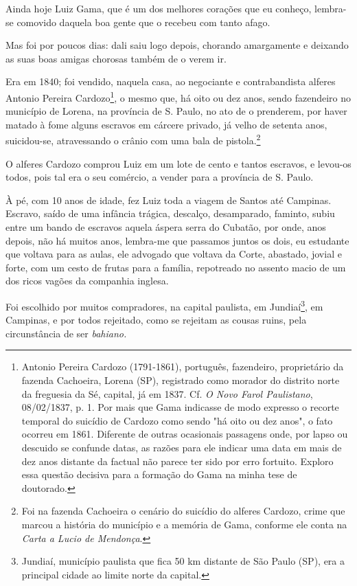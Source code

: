 Ainda hoje Luiz Gama, que é um dos melhores corações que eu conheço,
lembra-se comovido daquela boa gente que o recebeu com tanto afago.

Mas foi por poucos dias: dali saiu logo depois, chorando amargamente e
deixando as suas boas amigas chorosas também de o verem ir.

Era em 1840; foi vendido, naquela casa, ao negociante e contrabandista
alferes Antonio Pereira Cardozo\footnote{Antonio Pereira Cardozo
  (1791-1861), português, fazendeiro, proprietário da fazenda Cachoeira,
  Lorena (SP), registrado como morador do distrito norte da freguesia da
  Sé, capital, já em 1837. Cf. \emph{O Novo Farol Paulistano},
  08/02/1837, p. 1. Por mais que Gama indicasse de modo expresso o
  recorte temporal do suicídio de Cardozo como sendo "há oito ou dez
  anos", o fato ocorreu em 1861. Diferente de outras ocasionais
  passagens onde, por lapso ou descuido se confunde datas, as razões
  para ele indicar uma data em mais de dez anos distante da factual não
  parece ter sido por erro fortuito. Exploro essa questão decisiva para
  a formação do Gama na minha tese de doutorado.}, o mesmo que, há oito
ou dez anos, sendo fazendeiro no município de Lorena, na província de S.
Paulo, no ato de o prenderem, por haver matado à fome alguns escravos em
cárcere privado, já velho de setenta anos, suicidou-se, atravessando o
crânio com uma bala de pistola.\footnote{Foi na fazenda Cachoeira o
  cenário do suicídio do alferes Cardozo, crime que marcou a história do
  município e a memória de Gama, conforme ele conta na \emph{Carta a
  Lucio de Mendonça}.}

O alferes Cardozo comprou Luiz em um lote de cento e tantos escravos, e
levou-os todos, pois tal era o seu comércio, a vender para a província
de S. Paulo.

À pé, com 10 anos de idade, fez Luiz toda a viagem de Santos até
Campinas. Escravo, saído de uma infância trágica, descalço, desamparado,
faminto, subiu entre um bando de escravos aquela áspera serra do
Cubatão, por onde, anos depois, não há muitos anos, lembra-me que
passamos juntos os dois, eu estudante que voltava para as aulas, ele
advogado que voltava da Corte, abastado, jovial e forte, com um cesto de
frutas para a família, repotreado no assento macio de um dos ricos
vagões da companhia inglesa.

Foi escolhido por muitos compradores, na capital paulista, em
Jundiaí\footnote{Jundiaí, município paulista que fica 50 km distante
  de São Paulo (SP), era a principal cidade ao limite norte da capital.},
em Campinas, e por todos rejeitado, como se rejeitam as cousas ruins,
pela circunstância de ser \emph{bahiano.}

